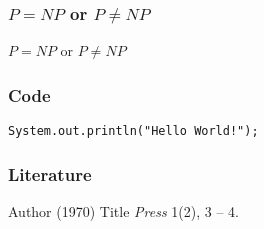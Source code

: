 \documentclass{beamer}
\begin{document}
\begin{frame}
\frametitle{$P = NP$ or $P \neq NP$}
\begin{theorem}[???]
$P = NP$ or $P \neq NP$
\end{theorem}
\end{frame}


\begin{frame}[fragile] %
\frametitle{Code}
\begin{example}[Code]
\begin{verbatim}
System.out.println("Hello World!");
\end{verbatim}
\end{example}
\end{frame}


\begin{frame}
\frametitle{Literature}
\footnotesize{
\begin{thebibliography}{99}
 Author (1970)
\newblock Title
\newblock \emph{Press} 1(2), 3 -- 4.
\end{thebibliography}
}
\end{frame}
\end{document}

